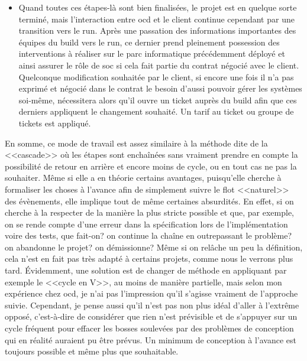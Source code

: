 \documentclass[12pt, oneside, a4paper, titlepage]{report}
\begin{document}
\begin{itemize}
    \item Quand toutes ces étapes-là sont bien finalisées, le projet est en
        quelque sorte terminé, mais l'interaction entre \gls{ocd} et le client
        continue cependant par une transition vers le \gls{run}. Après une
        passation des informations importantes des équipes du \gls{build} vers
        le \gls{run}, ce dernier prend pleinement possession des interventions à
        réaliser sur le parc informatique précédemment déployé et ainsi assurer
        le rôle de \gls{soc} si cela fait partie du contrat négocié avec le
        client. Quelconque modification souhaitée par le client, si encore une
        fois il n'a pas exprimé et négocié dans le contrat le besoin d'aussi
        pouvoir gérer les systèmes soi-même, nécessitera alors qu'il ouvre un
        ticket auprès du \gls{build} afin que ces derniers appliquent le
        changement souhaité. Un tarif au ticket ou groupe de tickets est
        appliqué.

\end{itemize}

En somme, ce mode de travail est assez similaire à la méthode dite de la
<<cascade>> où les étapes sont enchaînées sans vraiment prendre en compte la
possibilité de retour en arrière et encore moins de cycle, ou en tout cas ne pas
la souhaiter. Même si elle a en théorie certains avantages, puisqu'elle cherche
à formaliser les choses à l'avance afin de simplement suivre le flot <<naturel>>
des évènements, elle implique tout de même certaines absurdités. En effet, si on
cherche à la respecter de la manière la plus stricte possible et que, par
exemple, on se rende compte d'une erreur dans la spécification lors de
l'implémentation voire des tests, que fait-on? on continue la chaîne en
outrepassant le problème? on abandonne le projet? on démissionne? Même si on
relâche un peu la définition, cela n'est en fait pas très adapté à certains
projets, comme nous le verrons plus tard. Évidemment, une solution est de
changer de méthode en appliquant par exemple le <<cycle en V>>, au moins de
manière partielle, mais selon mon expérience chez \gls{ocd}, je n'ai pas
l'impression qu'il s'agisse vraiment de l'approche suivie. Cependant, je pense
aussi qu'il n'est pas non plus idéal d'aller à l'extrême opposé, c'est-à-dire de
considérer que rien n'est prévisible et de s'appuyer sur un cycle fréquent pour
effacer les bosses soulevées par des problèmes de conception qui en réalité
auraient pu être prévus. Un minimum de conception à l'avance est toujours
possible et même plus que souhaitable.
\end{document}
